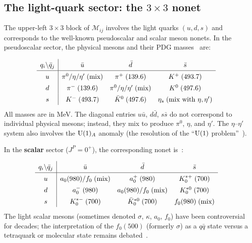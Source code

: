 \documentclass[11pt,a4paper]{article}
\begin{document}
\subsection{The light-quark sector: the $3 \times 3$ nonet}
\label{sec:3x3-block}

The upper-left $3 \times 3$ block of $\mathcal{M}_{ij}$ involves the
light quarks $(u, d, s)$ and corresponds to the well-known pseudoscalar
and scalar meson nonets.  In the pseudoscalar sector, the physical
mesons and their PDG masses~\cite{PDG2024} are:

\begin{equation}\label{eq:3x3-pseudo}
\renewcommand{\arraystretch}{1.4}
\begin{array}{c|ccc}
  q_i \backslash \bar{q}_j & \bar{u} & \bar{d} & \bar{s} \\
\hline
  u & \pi^0/\eta/\eta' \;\text{(mix)} & \pi^+\; (139.6) & K^+\; (493.7) \\
  d & \pi^-\; (139.6) & \pi^0/\eta/\eta' \;\text{(mix)} & K^0\; (497.6) \\
  s & K^-\; (493.7) & \bar{K}^0\; (497.6) & \eta_s \;\text{(mix with $\eta,\eta'$)} \\
\end{array}
\end{equation}
All masses are in MeV.  The diagonal entries
$u\bar{u}$, $d\bar{d}$, $s\bar{s}$ do not correspond to individual
physical mesons; instead, they mix to produce $\pi^0$, $\eta$, and
$\eta'$.  The $\eta$--$\eta'$ system also involves the $\mathrm{U}(1)_A$
anomaly (the resolution of the ``$\mathrm{U}(1)$ problem''~\cite{tHooft1976}).

In the \textbf{scalar} sector ($J^P = 0^+$), the corresponding nonet
is~\cite{PDG2024}:

\begin{equation}\label{eq:3x3-scalar}
\renewcommand{\arraystretch}{1.4}
\begin{array}{c|ccc}
  q_i \backslash \bar{q}_j & \bar{u} & \bar{d} & \bar{s} \\
\hline
  u & a_0(980)/f_0 \;\text{(mix)} & a_0^+\; (980) & K_0^{*+}\; (700) \\
  d & a_0^-\; (980) & a_0(980)/f_0 \;\text{(mix)} & K_0^{*0}\; (700) \\
  s & K_0^{*-}\; (700) & \bar{K}_0^{*0}\; (700) & f_0(980) \;\text{(mix)} \\
\end{array}
\end{equation}
The light scalar mesons (sometimes denoted $\sigma$, $\kappa$, $a_0$,
$f_0$) have been controversial for decades; the interpretation of the
$f_0(500)$ (formerly $\sigma$) as a $q\bar{q}$ state versus a
tetraquark or molecular state remains debated~\cite{PDG2024}.
\end{document}
